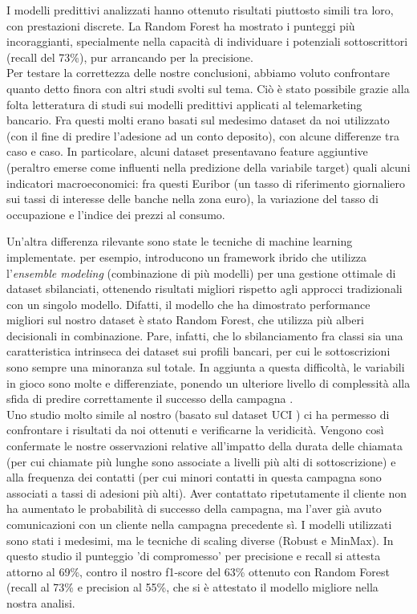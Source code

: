 \documentclass[11,5pt, a4paper]{article}
\begin{document}
I modelli predittivi analizzati hanno ottenuto risultati piuttosto simili tra loro, con prestazioni discrete. La Random Forest ha mostrato i punteggi più incoraggianti, specialmente nella capacità di individuare i potenziali sottoscrittori (recall del 73\%), pur arrancando per la precisione. \\

Per testare la correttezza delle nostre conclusioni, abbiamo voluto confrontare quanto detto finora con altri studi svolti sul tema. Ciò è stato possibile grazie alla folta letteratura di studi sui modelli predittivi applicati al telemarketing bancario. Fra questi molti erano basati sul medesimo dataset da noi utilizzato (con il fine di predire l’adesione ad un conto deposito), con alcune differenze tra caso e caso. In particolare, alcuni dataset presentavano feature aggiuntive (peraltro emerse come influenti nella predizione della variabile target) quali alcuni indicatori macroeconomici: fra questi Euribor (un tasso di riferimento giornaliero sui tassi di interesse delle banche nella zona euro), la variazione del tasso di occupazione e l'indice dei prezzi al consumo.

Un’altra differenza rilevante sono state le tecniche di machine learning implementate. \citet{Zhang_RF_2022} per esempio, introducono un framework ibrido che utilizza l’\textit{ensemble modeling} (combinazione di più modelli) per una gestione ottimale di dataset sbilanciati, ottenendo risultati migliori rispetto agli approcci tradizionali con un singolo modello. Difatti, il modello che ha dimostrato performance migliori sul nostro dataset è stato Random Forest, che utilizza più alberi decisionali in combinazione.
Pare, infatti, che lo sbilanciamento fra classi sia una caratteristica intrinseca dei dataset sui profili bancari, per cui le sottoscrizioni sono sempre una minoranza sul totale. In aggiunta a questa difficoltà, le variabili in gioco sono molte e differenziate, ponendo un ulteriore livello di complessità alla sfida di predire correttamente il successo della campagna \citep{peter_2025}. \\

Uno studio \citep{medium_2025} molto simile al nostro (basato sul dataset UCI \citep{bank_marketing_222}) ci ha permesso di confrontare i risultati da noi ottenuti e verificarne la veridicità.
Vengono così confermate le nostre osservazioni relative all’impatto della durata delle chiamata (per cui chiamate più lunghe sono associate a livelli più alti di sottoscrizione) e alla frequenza dei contatti (per cui minori contatti in questa campagna sono associati a tassi di adesioni più alti).
Aver contattato ripetutamente il cliente non ha aumentato le probabilità di successo della campagna, ma l’aver già avuto comunicazioni con un cliente nella campagna precedente sì. I modelli utilizzati sono stati i medesimi, ma le tecniche di scaling diverse (Robust e MinMax). In questo studio il punteggio 'di compromesso' per precisione e recall si attesta attorno al 69\%, contro il nostro f1-score del 63\% ottenuto con Random Forest (recall al 73\% e precision al 55\%, che si è attestato il modello migliore nella nostra analisi. \\
\end{document}
